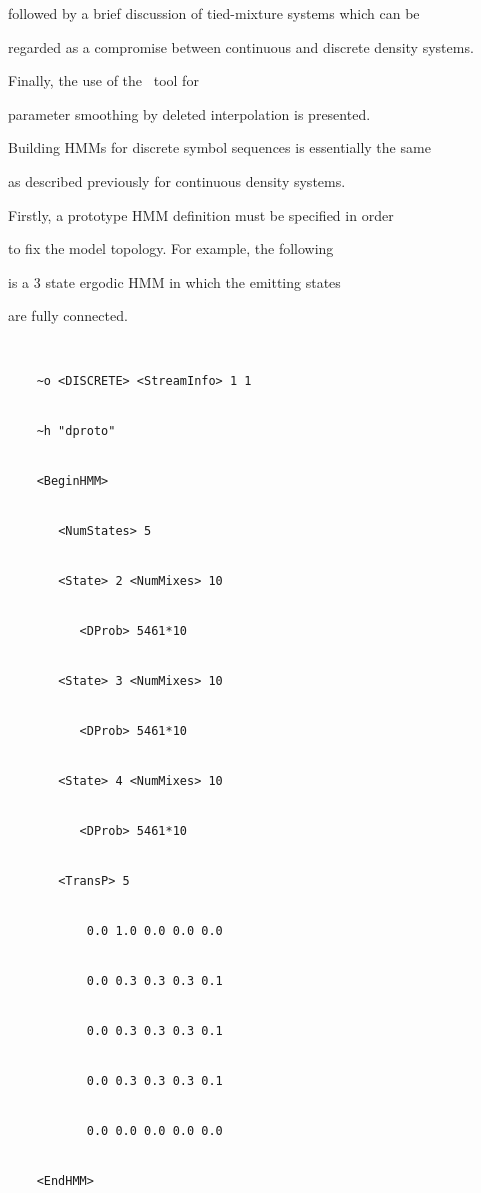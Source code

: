 followed by a brief discussion of tied-mixture systems which can be 


regarded as a compromise between continuous and discrete density systems.


Finally, the use of the \HTK\ tool  for


parameter smoothing by deleted interpolation is presented.










Building HMMs for discrete symbol sequences is essentially the same


as described previously for continuous density systems. 


Firstly, a prototype HMM definition must be specified in order


to fix the model topology.  For example, the following


is a 3 state ergodic HMM in which the emitting states


are fully connected.


\begin{verbatim}


    ~o <DISCRETE> <StreamInfo> 1 1 


    ~h "dproto"


    <BeginHMM>


       <NumStates> 5 


       <State> 2 <NumMixes> 10


          <DProb> 5461*10


       <State> 3 <NumMixes> 10


          <DProb> 5461*10


       <State> 4 <NumMixes> 10


          <DProb> 5461*10


       <TransP> 5


           0.0 1.0 0.0 0.0 0.0


           0.0 0.3 0.3 0.3 0.1


           0.0 0.3 0.3 0.3 0.1


           0.0 0.3 0.3 0.3 0.1


           0.0 0.0 0.0 0.0 0.0


    <EndHMM>


\end{verbatim}


